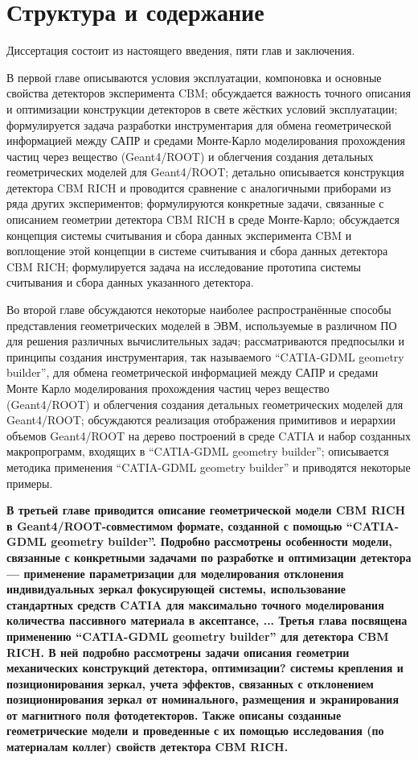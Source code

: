 \section*{Структура и содержание}\label{sec:secStructureAndContent}

Диссертация состоит из настоящего введения, пяти глав и заключения.

В первой главе
описываются условия эксплуатации, компоновка и основные свойства детекторов эксперимента CBM;
обсуждается важность точного описания и оптимизации конструкции детекторов в свете жёстких условий эксплуатации;
формулируется задача разработки инструментария для обмена геометрической информацией между САПР и средами Монте-Карло моделирования прохождения частиц через вещество (Geant4/ROOT) и облегчения создания детальных геометрических моделей для Geant4/ROOT;
детально описывается конструкция детектора CBM RICH и проводится сравнение с аналогичными приборами из ряда других экспериментов;
формулируются конкретные задачи, связанные с описанием геометрии детектора CBM RICH в среде Монте-Карло;
обсуждается концепция системы считывания и сбора данных эксперимента CBM и воплощение этой концепции в системе считывания и сбора данных детектора CBM RICH;
формулируется задача на исследование прототипа системы считывания и сбора данных указанного детектора.

Во второй главе
обсуждаются некоторые наиболее распространённые способы представления геометрических моделей в ЭВМ, используемые в различном ПО для решения различных вычислительных задач;
рассматриваются предпосылки и принципы создания инструментария, так называемого ``CATIA-GDML geometry builder'', для обмена геометрической информацией между САПР и средами Монте Карло моделирования прохождения частиц через вещество (Geant4/ROOT) и облегчения создания детальных геометрических моделей для Geant4/ROOT;
обсуждаются реализация отображения примитивов и иерархии объемов Geant4/ROOT на дерево построений в среде CATIA и набор созданных макропрограмм, входящих в ``CATIA-GDML geometry builder'';
описывается методика применения ``CATIA-GDML geometry builder'' и приводятся некоторые примеры.

\textbf{В третьей главе
приводится описание геометрической модели CBM RICH в Geant4/ROOT-совместимом формате, созданной с помощью ``CATIA-GDML geometry builder''. Подробно рассмотрены особенности модели, связанные с конкретными задачами по разработке и оптимизации детектора --- применение параметризации для моделирования отклонения индивидуальных зеркал фокусирующей системы, использование стандартных средств CATIA для максимально точного моделирования количества пассивного материала в аксептансе, ...
Третья глава посвящена применению ``CATIA-GDML geometry builder'' для детектора CBM RICH. В ней подробно рассмотрены задачи описания геометрии механических конструкций детектора, оптимизации? системы крепления и позиционирования зеркал, учета эффектов, связанных с отклонением позиционирования зеркал от номинального, размещения и экранирования от магнитного поля фотодетекторов. Также описаны созданные геометрические модели и проведенные с их помощью исследования (по материалам коллег) свойств детектора CBM RICH.
}

